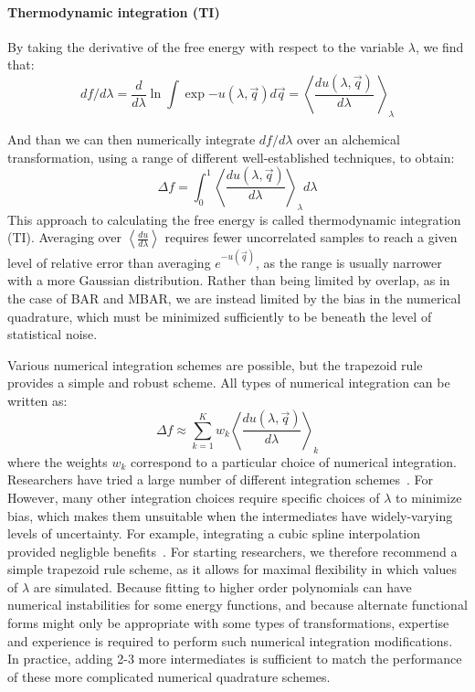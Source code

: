 \documentclass[9pt,bestpractices]{livecoms}
\newcommand{\expect}[1]{\left\langle{#1}\right\rangle}
\begin{document}
\paragraph{Thermodynamic integration (TI)}

By taking the derivative of the free energy with respect to the
variable $\lambda$, we find that:
\begin{equation}
df/d\lambda = \frac{d}{d\lambda} \ln \int \exp{-u(\lambda,\vec{q})} d\vec{q} = \expect{\frac{du(\lambda,\vec{q})}{d\lambda}\
}_{\lambda} 
\end{equation}

And than we can then numerically integrate $df/d\lambda$ over an alchemical transformation, using a range of different well-established techniques, to obtain:
\begin{equation}
\Delta f    = \int_{0}^{1} \expect{\frac{du(\lambda,\vec{q})}{d\lambda}}_{\lambda}  d\lambda    
\end{equation}
This approach to calculating the free energy is called thermodynamic integration (TI). Averaging over $\expect{\frac{du}{d\lambda}}$ requires
fewer uncorrelated samples to reach a given level of relative error
than averaging $e^{-u(\vec{q})}$, as the range is usually
narrower with a more Gaussian distribution. Rather than being limited by overlap, as in the case of BAR and MBAR, we are instead limited by the bias in the numerical quadrature, which must be minimized sufficiently to be beneath the level of statistical noise.

Various numerical integration schemes are possible, but the trapezoid
rule provides a simple and robust scheme.  All types of
numerical integration can be written as:
\[ \Delta f \approx \sum_{k=1}^{K} w_k
\expect{\frac{du(\lambda,\vec{q})}{d\lambda}}_{k} \] where the weights
$w_k$ correspond to a particular choice of numerical integration.
Researchers have tried a large number of different integration
schemes~\cite{resat1993studies,jorge2010effect,shyu2009reducing}. For However, many other integration choices require specific choices of $\lambda$
to minimize bias, which makes them unsuitable when the intermediates
have widely-varying levels of uncertainty. For example, integrating a cubic spline interpolation provided negligble benefits~\cite{paliwal2011benchmark}. For starting researchers, we therefore recommend a simple trapezoid rule scheme, as it allows for maximal flexibility in which values of $\lambda$ are simulated.  Because fitting to higher
order polynomials can have numerical instabilities for some energy functions, and because alternate functional forms might only be appropriate
with some types of transformations, expertise and experience is
required to perform such numerical integration modifications.  In practice, adding 2-3 more intermediates is sufficient to match the performance of these more complicated numerical quadrature schemes.
\end{document}
